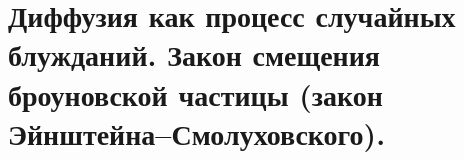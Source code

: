 \section{\normalsize Диффузия как процесс случайных блужданий. Закон смещения броуновской частицы (закон Эйнштейна--Смолуховского).}